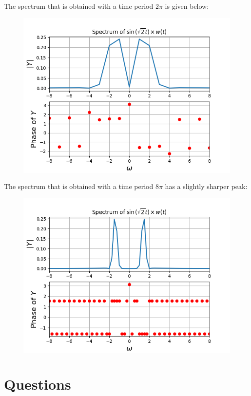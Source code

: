 \documentclass[12pt, a4paper]{article}
\begin{document}
The spectrum that is obtained with a time period $2\pi$ is given below:
\begin{figure}[H]
    \centering
    \includegraphics[scale=0.7]{eg6.png}
\end{figure}

The spectrum that is obtained with a time period $8\pi$ has a slightly sharper peak:
\begin{figure}[H]
    \centering
    \includegraphics[scale=0.7]{eg7.png}
\end{figure}
\pagebreak


\section{Questions}
\end{document}
